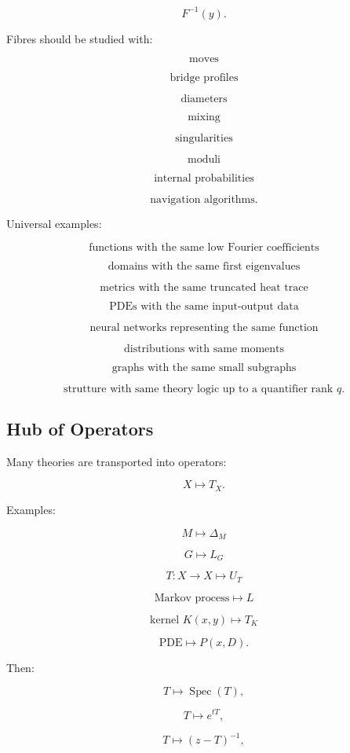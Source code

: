 \documentclass[11pt]{article}
\begin{document}
\[
F^{-1}(y).
\]

Fibres should be studied with:

\[
\text{moves}
\]

\[
\text{bridge profiles}
\]

\[
\text{diameters}
\]

\[
\text{mixing}
\]

\[
\text{singularities}
\]

\[
\text{moduli}
\]

\[
\text{internal probabilities}
\]

\[
\text{navigation algorithms}.
\]

Universal examples:

\[
\text{functions with the same low Fourier coefficients}
\]

\[
\text{domains with the same first eigenvalues}
\]

\[
\text{metrics with the same truncated heat trace}
\]

\[
\text{PDEs with the same input-output data}
\]

\[
\text{neural networks representing the same function}
\]

\[
\text{distributions with same moments}
\]

\[
\text{graphs with the same small subgraphs}
\]

\[
\text{strutture with same theory logic up to a quantifier rank }q.
\]



\subsection{Hub of Operators}

Many theories are transported into operators:

\[
X\mapsto T_X.
\]

Examples:

\[
M\mapsto \Delta_M
\]

\[
G\mapsto L_G
\]

\[
T:X\to X\mapsto U_T
\]

\[
\text{Markov process}\mapsto L
\]

\[
\text{kernel }K(x,y)\mapsto T_K
\]

\[
\text{PDE}\mapsto P(x,D).
\]

Then:

\[
T\mapsto \operatorname{Spec}(T),
\]

\[
T\mapsto e^{tT},
\]

\[
T\mapsto (z-T)^{-1},
\]
\end{document}
